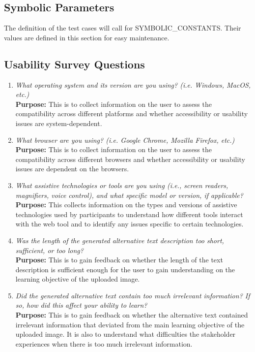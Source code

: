 \documentclass[12pt, titlepage]{article}
\begin{document}
\subsection{Symbolic Parameters}

The definition of the test cases will call for SYMBOLIC\_CONSTANTS.
Their values are defined in this section for easy maintenance.

\subsection{Usability Survey Questions}
\label{appendix:usability}

\begin{enumerate}[label=UA-Q \arabic*., wide=0pt, leftmargin=*]
  \item \emph{What operating system and its version are you using? (i.e. Windows, MacOS, etc.)}\\[2mm]
    {\bf Purpose:} This is to collect information on the user to assess the compatibility across different platforms and
    whether accessibility or usability issues are system-dependent.

  \item \emph{What browser are you using? (i.e. Google Chrome, Mozilla Firefox, etc.)}\\[2mm]
  {\bf Purpose:} This is to collect information on the user to assess the compatibility across different browsers and
  whether accessibility or usability issues are dependent on the browsers.

  \item \emph{What assistive technologies or tools are you using (i.e., screen readers, magnifiers, voice control), and what specific model or version, if applicable?}\\[2mm]
  {\bf Purpose:} This collects information on the types and versions of assistive technologies used by participants to understand how different tools interact with the web tool 
  and to identify any issues specific to certain technologies.

  \item \emph{Was the length of the generated alternative text description too short, sufficient, or too long?}\\[2mm]
    {\bf Purpose:} This is to gain feedback on whether the length of the text description is sufficient enough 
    for the user to gain understanding on the learning objective of the uploaded image.

  \item \emph{Did the generated alternative text contain too much irrelevant information? If so, how did this affect 
  your ability to learn?}\\[2mm]
    {\bf Purpose:} This is to gain feedback on whether the alternative text contained irrelevant information that deviated 
    from the main learning objective of the uploaded image. It is also to understand what difficulties the stakeholder experiences 
    when there is too much irrelevant information.
  

\end{enumerate}
\end{document}

